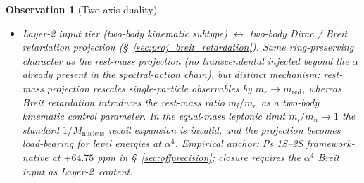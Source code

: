\documentclass[11pt]{article}
\newtheorem{observation}{Observation}
\begin{document}
\begin{observation}[Two-axis duality]
\begin{itemize}
$\mathrm{Vol}(S^3) = 2\pi^2$, or the vertex model's $1/(4\pi)$
unit-$S^2$ normalization), (b)~spectral-action even-zeta content
$\pi^{2k}\cdot\mathbb{Q}$ at integer~$s$ (the $\sqrt{\pi}$ of the
heat-trace coefficients is a normalisation removed by $\Gamma(s)$, not
ring content), (c)~the M3 vertex-parity Hurwitz / Dirichlet-$L$
channel (\S~\ref{sec:proj_spinor} with vertex restriction), or
(d)~a temporal Matsubara $2\pi/\beta$ (this projection);\ $\pi$ also
enters through embedding-tier routes outside this list (e.g.\ the
genus-one elliptic periods of the embedding tier; a covariant-gauge
computation would add Feynman-parameter denominators, but none has
been performed in the framework).  The
Casimir constant on $S^3 \times S^1_\beta$ is the cleanest
illustration: spatial-only Casimir is $1/240$ (rational, no $\pi$);
adding $S^1_\beta$ injects $\pi$ exactly through the Matsubara
mechanism.
\item \emph{Layer-2 input tier (two-body kinematic subtype)}
$\leftrightarrow$ two-body Dirac / Breit retardation projection
(\S~\ref{sec:proj_breit_retardation}).  Same ring-preserving
character as the rest-mass projection (no transcendental injected
beyond the $\alpha$ already present in the spectral-action chain),
but distinct mechanism: rest-mass projection rescales single-particle
observables by $m_e \to m_\text{red}$, whereas Breit retardation
introduces the rest-mass ratio $m_l/m_n$ as a two-body kinematic
control parameter.  In the equal-mass leptonic limit
$m_l/m_n \to 1$ the standard $1/M_\text{nucleus}$ recoil expansion
is invalid, and the projection becomes load-bearing for level
energies at $\alpha^4$.  Empirical anchor: Ps 1S--2S framework-native
at $+64.75$ ppm in \S~\ref{sec:offprecision}; closure requires the
$\alpha^4$ Breit input as Layer-2~content.
\end{itemize}
\end{observation}
\end{document}
